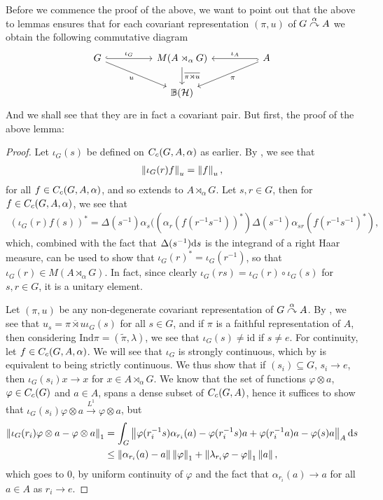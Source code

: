 Before we commence the proof of the above, we want to point out that the above to lemmas ensures that for each covariant representation $(\pi , u)$ of $G \stackrel{\alpha}{\curvearrowright} A$ we obtain the following commutative diagram
\begin{equation}
	\begin{tikzcd}
		G \arrow[rr, "\iota_G", hook] \arrow[rrd, "u"'] && M(A \rtimes_\alpha G) \arrow[d, "\overline{\pi \rtimes u }"] && A \arrow[ll,"\iota_A"',hook] \arrow[lld, "\pi"]\\
		& &\mathbb{B}(\H)&&
	\end{tikzcd}
	\label{diag:iotacom}
\end{equation}
And we shall see that they are in fact a covariant pair. But first, the proof of the above lemma:
\begin{proof}
	Let $\iota_G(s)$ be defined on $C_c(G,A,\alpha)$ as earlier. By , we see that
	\begin{align*}
		\left\lVert \iota_G(r) f \right\rVert_u = \left\lVert f \right\rVert_u,
	\end{align*}
	for all $f \in C_c(G,A,\alpha)$, and so extends to $A \rtimes_\alpha G$. Let $s,r \in G$, then for $f \in C_c(G,A,\alpha)$, we see that
	\begin{align*}
		(\iota_G(r) f(s))^* = \Delta(s^{-1}) \alpha_s ( (\alpha_r(f(r^{-1}s^{-1}))^*) \Delta(s^{-1}) \alpha_{sr}(f(r^{-1}s^{-1})^*),
	\end{align*}
	which, combined with the fact that $\Delta(s^{-1}) \mathrm{d} s$ is the integrand of a right Haar measure, can be used to show that $\iota_G(r)^* = \iota_G(r^{-1})$, so that $\iota_G(r) \in M(A \rtimes_\alpha G)$. In fact, since clearly $\iota_G(rs) = \iota_G(r) \circ \iota_G(s)$ for $s,r \in G$, it is a unitary element.

	Let $(\pi,u)$ be any non-degenerate covariant representation of $G \stackrel{\alpha}{\curvearrowright} A$. By , we see that $u_s  = \overline{ \pi \rtimes u} \iota_G(s)$ for all $ s \in G$, and if $\pi$ is a faithful representation of $A$, then considering  $\mathrm{Ind} \pi = (\tilde \pi, \lambda)$, we see that $\iota_G(s) \neq \mathrm{id}$ if $s \neq e$. For continuity, let $f \in C_c(G,A,\alpha)$. We will see that $\iota_G$ is strongly continuous, which by  is equivalent to being strictly continuous. We thus show that if $(s_i)\subseteq G$, $s_i \to e$, then $\iota_G(s_i) x \to x$ for $x \in A \rtimes_\alpha G$. We know that the set of functions $\varphi \otimes a$, $\varphi \in C_c(G)$ and $a \in A$, spans a dense subset of $C_c(G,A)$, hence it suffices to show that $\iota_G(s_i) \varphi \otimes a \stackrel{L^1}{\to} \varphi \otimes a$, but
	\begin{align*}
		\left\lVert \iota_G(r_{i}) \varphi \otimes a - \varphi \otimes a \right\rVert_1 &= \int_G \left\lVert \varphi(r_{i}^{-1}s) \alpha_{r_i}(a) - \varphi(r_i^{-1}s) a + \varphi(r_{i}^{-1}a) a - \varphi(s) a \right\rVert_A \mathrm{d} s\\ 
		& \leq \left\lVert \alpha_{r_i}(a) - a \right\rVert \left\lVert \varphi \right\rVert_1 + \left\lVert \lambda_{r_i} \varphi - \varphi \right\rVert_1 \left\lVert a \right\rVert,
	\end{align*}
	which goes to $0$, by uniform continuity of $\varphi$ and the fact that $\alpha_{r_i}(a) \to a$ for all $ a\in A$ as $r_i \to e$.
\end{proof}
